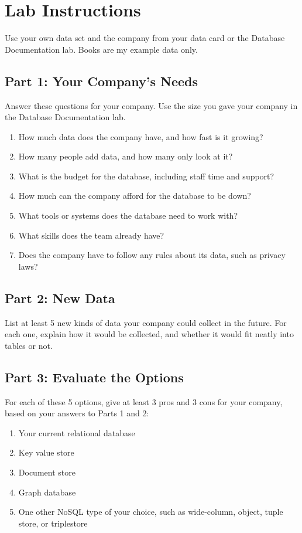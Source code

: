 \documentclass[12pt]{article}
\begin{document}
\section*{Lab Instructions}
Use your own data set and the company from your data card or the Database Documentation lab. Books are my example data only.

\subsection*{Part 1: Your Company's Needs}
Answer these questions for your company. Use the size you gave your company in the Database Documentation lab.
\begin{enumerate}
    \item How much data does the company have, and how fast is it growing?
    \item How many people add data, and how many only look at it?
    \item What is the budget for the database, including staff time and support?
    \item How much can the company afford for the database to be down?
    \item What tools or systems does the database need to work with?
    \item What skills does the team already have?
    \item Does the company have to follow any rules about its data, such as privacy laws?
\end{enumerate}

\subsection*{Part 2: New Data}
List at least 5 new kinds of data your company could collect in the future. For each one, explain how it would be collected, and whether it would fit neatly into tables or not.

\subsection*{Part 3: Evaluate the Options}
For each of these 5 options, give at least 3 pros and 3 cons for your company, based on your answers to Parts 1 and 2:
\begin{enumerate}
    \item Your current relational database
    \item Key value store
    \item Document store
    \item Graph database
    \item One other NoSQL type of your choice, such as wide-column, object, tuple store, or triplestore
\end{enumerate}
\end{document}
